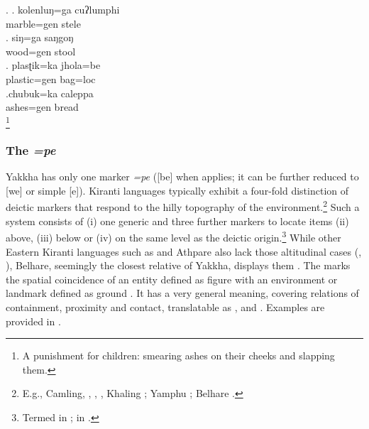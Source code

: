 \ex. \ag. kolenluŋ=ga   cuʔlumphi\\
	marble{\sc =gen} stele\\
	 
 	\bg. siŋ=ga    saŋgoŋ\\
	wood{\sc =gen} stool	\\
\bg. plasʈik=ka    jhola=be\\
plastic{\sc =gen} bag{\sc =loc}\\
	 
	  \bg.chubuk=ka caleppa\\
	  ashes{\sc =gen} bread\\
	  \footnote{A punishment for children: smearing ashes on their cheeks and slapping them.}   


\subsubsection{The  \emph{=pe}}\label{case-loc}

Yakkha has only one   marker \emph{=pe} ([be] when  applies; it can be further reduced to [we] or simple [e]). Kiranti languages typically exhibit a four-fold distinction of deictic   markers that respond to the hilly topography of the environment.\footnote{E.g., Camling, , , , Khaling \citep{Ebert1994The-structure}; Yamphu \citep[72]{Rutgers1998Yamphu}; Belhare \citep[226]{Bickel2001Deictic}.} Such a  system consists of (i) one generic  and three further markers to locate items (ii) above, (iii) below or (iv) on the same level as the deictic origin.\footnote{Termed  in \citet[94]{Ebert1994The-structure};  in \citet[62]{Dirksmeyer2008Spatial}.} While other Eastern Kiranti languages such as  and Athpare also lack those altitudinal cases (\citealt[118]{Ebert1997A-grammar}, \citealt[49]{Driem1987A-grammar}), Belhare, seemingly the closest relative of Yakkha, displays them \citep[226]{Bickel2001Deictic}. 
The  marks the spatial coincidence of an entity defined as {\sc figure} with an environment or landmark defined as {\sc ground}  \citep[3]{Levinsonetal2006_Grammars}.  It has a very general meaning, covering relations of containment, proximity and contact, translatable as ,  and . Examples are provided in \Next. 

